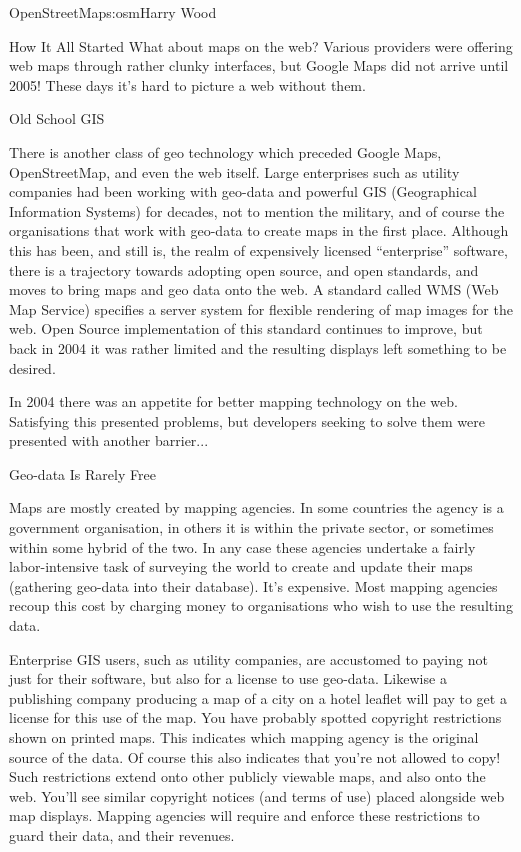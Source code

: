 \begin{aosachapter}{OpenStreetMap}{s:osm}{Harry Wood}
\begin{aosasect1}{How It All Started}
What about maps on the web? Various providers were offering web maps
through rather clunky interfaces, but Google Maps did not arrive until
2005! These days it's hard to picture a web without them.

\begin{aosasect2}{Old School GIS}

There is another class of geo technology which preceded Google Maps,
OpenStreetMap, and even the web itself. Large enterprises such as
utility companies had been working with geo-data and powerful GIS
(Geographical Information Systems) for decades, not to mention the
military, and of course the organisations that work with geo-data to
create maps in the first place. Although this has been, and still is,
the realm of expensively licensed ``enterprise'' software, there is a
trajectory towards adopting open source, and open standards, and moves
to bring maps and geo data onto the web. A standard called WMS (Web
Map Service) specifies a server system for flexible rendering of map
images for the web. Open Source implementation of this standard
continues to improve, but back in 2004 it was rather limited and the
resulting displays left something to be desired.

In 2004 there was an appetite for better mapping technology on the
web. Satisfying this presented problems, but developers seeking to
solve them were presented with another barrier...

\end{aosasect2}

\begin{aosasect2}{Geo-data Is Rarely Free}

Maps are mostly created by mapping agencies. In some countries the
agency is a government organisation, in others it is within the
private sector, or sometimes within some hybrid of the two. In any
case these agencies undertake a fairly labor-intensive task of
surveying the world to create and update their maps (gathering
geo-data into their database). It's expensive. Most mapping agencies
recoup this cost by charging money to organisations who wish to use
the resulting data.

Enterprise GIS users, such as utility companies, are accustomed to
paying not just for their software, but also for a license to use
geo-data. Likewise a publishing company producing a map of a city on a
hotel leaflet will pay to get a license for this use of the map. You
have probably spotted copyright restrictions shown on printed
maps. This indicates which mapping agency is the original source of
the data. Of course this also indicates that you're not allowed to
copy! Such restrictions extend onto other publicly viewable maps, and
also onto the web. You'll see similar copyright notices (and terms of
use) placed alongside web map displays. Mapping agencies will require
and enforce these restrictions to guard their data, and their
revenues.


\end{aosasect2}
\end{aosasect1}
\end{aosachapter}
